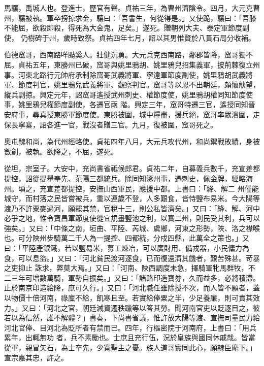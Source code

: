 \begin{pinyinscope}
 馬驤，禹城人也。登進士，歷官有聲。貞祐三年，為曹州濟陰令。四月，大元克曹州，驤被執。軍卒搒掠求金，驤曰：「吾書生，何從得是。」又使跪，驤曰：「吾膝不能屈，欲殺即殺，得死為大金鬼，足矣。」遂死。贈朝列大夫、泰定軍節度副使，
 仍樹碑于州，歲時致祭。貞祐四年七月，詔以其男惟賢於八貫石局分收補。



 伯德窊哥，西南路咩颭奚人。壯健沉勇。大元兵克西南路，鄰郡皆降，窊哥獨不屈。貞祐五年，東勝州已破，窊哥與姚里鴉胡、姚里鴉兒招集義軍，披荊棘復立州事。河東北路行元帥府承制除窊哥武義將軍、寧遠軍節度副使，姚里鴉胡武義將軍、節度判官，姚里鴉兒武義將軍、觀察判官。窊哥等以恩不出朝廷，頗懷觖望，縱兵剽掠。興定元年，詔窊哥遙授武州刺史、權節度使，姚里鴉胡權同知節度使事，姚里鴉兒權節度副使，各遷官兩
 階。興定三年，窊哥特遷三官，遙授同知晉安府事，尋真授東勝軍節度使。東勝被圍，城中糧盡，援兵絕，窊哥率眾潰圍，走保長寧寨，詔各進一官，戰沒者贈三官。九月，復被圍，窊哥死之。



 奧屯醜和尚，為代州經略使。貞祐四年八月，大元兵攻代州，和尚禦戰敗績，身被數創，被執。欲降之，不屈，遂死。



 從坦，宗室子。大安中，充尚書省祗候郎君。貞祐二年，自募義兵數千，充宣差都提控，詔從提舉奉先、范陽三都統兵。除同知涿州事，遷刺史，佩金牌，經略海州。頃之，充宣差都提控，安撫山西軍民，應援中都。上書曰：「絳、解二
 州僅能城守，而村落之民皆嘗被兵，重以連歲不登，人多艱食，皆恃鹽布易米。今大陽等渡乃不許粟麥過河，願罷其禁，官稅十三，則公私皆濟矣。」又曰：「絳、解、河中必爭之地，惟令寶昌軍節度使從宜規畫鹽池之利，以實二州，則民受其利，兵可以強矣。」又曰：「中條之南，垣曲、平陸、芮城、虞鄉，河東之形勢，陜、洛之襟喉也。可分陜州步騎萬二千人為一提控、四都統，分戍四縣，此萬全之策也。」又曰：「平陸產銀鐵，若以鹽易米，募工煉冶，可以廣財用、備戎器，小民傭力為食，可以息盜。」又曰：「河北貧民渡河逐食，已而復還濟其饑者，艱苦殊甚。苛暴之吏抑止
 誅求，弊莫大焉。」又曰：「河南、陜西調度未急，擇騎軍牝馬群牧，不二三年可增數萬騎，軍勢自振矣。」又曰：「諸路印造寶券，久而益多，必將積滯。止於南京印造給降，庶可久行。」又曰：「河北職任雖除授不次，而人皆不願者，蓋以物價十倍河南，祿廩不給，飢寒且至。若實給俸粟之半，少足養廉，則可責其效力。」又曰：「河北之官，朝廷減資遷秩躐等以答其勞。聞河南官吏以貶逐目之，彼若以為信然，誰不解體？」書奏，下尚書省議，惟許放大陽等渡、宣撫司量民力給河北官俸、目河北為貶所者有禁而已。四年，行樞密院于河南府，上書曰：「用兵累年，出輒無功
 者，兵不素勵也。士庶且充行伍，況於皇族與國同休戚哉。皆當從軍，親冒矢石，為士卒先，少寬聖主之憂。族人道哥實同此心，願隸臣麾下。」宣宗嘉其忠，許之。




\end{pinyinscope}
